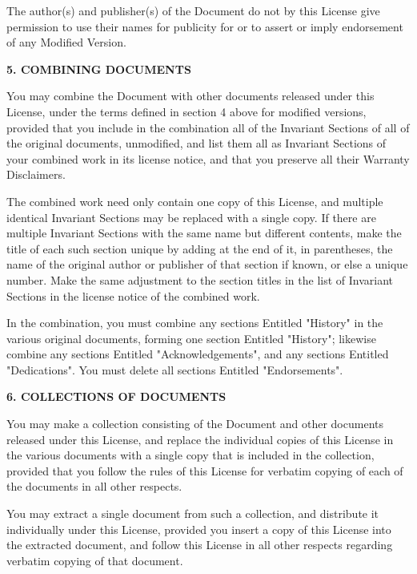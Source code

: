 The author(s) and publisher(s) of the Document do not by this License
give permission to use their names for publicity for or to assert or
imply endorsement of any Modified Version.


\begin{center}
{\Large\bf 5. COMBINING DOCUMENTS}
\end{center}


You may combine the Document with other documents released under this
License, under the terms defined in section 4 above for modified
versions, provided that you include in the combination all of the
Invariant Sections of all of the original documents, unmodified, and
list them all as Invariant Sections of your combined work in its
license notice, and that you preserve all their Warranty Disclaimers.

The combined work need only contain one copy of this License, and
multiple identical Invariant Sections may be replaced with a single
copy.  If there are multiple Invariant Sections with the same name but
different contents, make the title of each such section unique by
adding at the end of it, in parentheses, the name of the original
author or publisher of that section if known, or else a unique number.
Make the same adjustment to the section titles in the list of
Invariant Sections in the license notice of the combined work.

In the combination, you must combine any sections Entitled "History"
in the various original documents, forming one section Entitled
"History"; likewise combine any sections Entitled "Acknowledgements",
and any sections Entitled "Dedications".  You must delete all sections
Entitled "Endorsements".

\begin{center}
{\Large\bf 6. COLLECTIONS OF DOCUMENTS}
\end{center}

You may make a collection consisting of the Document and other documents
released under this License, and replace the individual copies of this
License in the various documents with a single copy that is included in
the collection, provided that you follow the rules of this License for
verbatim copying of each of the documents in all other respects.

You may extract a single document from such a collection, and distribute
it individually under this License, provided you insert a copy of this
License into the extracted document, and follow this License in all
other respects regarding verbatim copying of that document.


